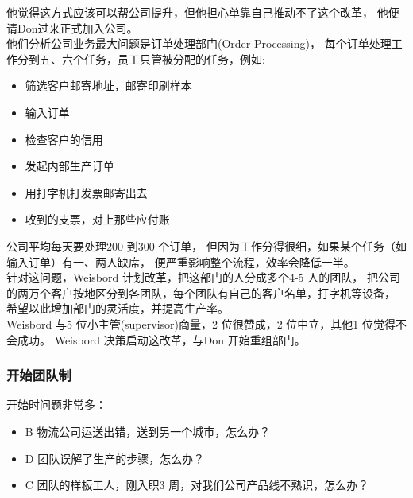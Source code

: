 他觉得这方式应该可以帮公司提升，但他担心单靠自己推动不了这个改革，
他便请Don过来正式加入公司。\\
他们分析公司业务最大问题是订单处理部门(Order Processing)，
每个订单处理工作分到五、六个任务，员工只管被分配的任务，例如:

\begin{itemize}
\tightlist
\item
  筛选客户邮寄地址，邮寄印刷样本
\item
  输入订单
\item
  检查客户的信用
\item
  发起内部生产订单
\item
  用打字机打发票邮寄出去
\item
  收到的支票，对上那些应付账
\end{itemize}

公司平均每天要处理200 到300 个订单，
但因为工作分得很细，如果某个任务（如输入订单）有一、两人缺席，
便严重影响整个流程，效率会降低一半。\\
针对这问题，Weisbord 计划改革，把这部门的人分成多个4-5 人的团队，
把公司的两万个客户按地区分到各团队，每个团队有自己的客户名单，打字机等设备，
希望以此增加部门的灵活度，并提高生产率。\\
Weisbord 与5 位小主管(supervisor)商量，2 位很赞成，2 位中立，其他1
位觉得不会成功。 Weisbord 决策启动这改革，与Don 开始重组部门。\\

\hypertarget{ux5f00ux59cbux56e2ux961fux5236}{%
\subsubsection{开始团队制}\label{ux5f00ux59cbux56e2ux961fux5236}}

开始时问题非常多：

\begin{itemize}
\tightlist
\item
  B 物流公司运送出错，送到另一个城市，怎么办？
\item
  D 团队误解了生产的步骤，怎么办？
\item
  C 团队的样板工人，刚入职3 周，对我们公司产品线不熟识，怎么办？
\end{itemize}

